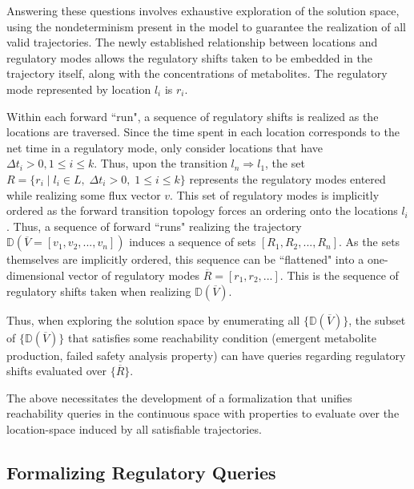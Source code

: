 Answering these questions involves exhaustive exploration of the solution space, using the nondeterminism present in the model to guarantee the realization of all valid trajectories. The newly established relationship between locations and regulatory modes allows the regulatory shifts taken to be embedded in the trajectory itself, along with the concentrations of metabolites. The regulatory mode represented by location $l_i$ is $r_i$.

Within each forward ``run", a sequence of regulatory shifts is realized as the locations are traversed. Since the time spent in each location corresponds to the net time in a regulatory mode, only consider locations that have $\Delta t_i > 0, 1 \leq i \leq k$. Thus, upon the transition $l_n \Rightarrow l_1$, the set $R = \{ r_i \; | \; l_i \in L, \; \Delta t_i > 0, \; 1 \leq i \leq k \}$ represents the regulatory modes entered while realizing some flux vector $v$. This set of regulatory modes is implicitly ordered as the forward transition topology forces an ordering onto the locations $l_i$. Thus, a sequence of forward ``runs" realizing the trajectory $\mathbb{D}(\overline{V} = [v_1, v_2, ..., v_n])$ induces a sequence of sets $[R_1, R_2, ..., R_n]$. As the sets themselves are implicitly ordered, this sequence can be ``flattened" into a one-dimensional vector of regulatory modes $\overline{R} = [r_1, r_2, ...]$. This is the sequence of regulatory shifts taken when realizing $\mathbb{D}(\overline{V})$.

Thus, when exploring the solution space by enumerating all $\{ \mathbb{D}(\overline{V})\}$, the subset of $\{ \mathbb{D}(\overline{V})\}$ that satisfies some reachability condition (emergent metabolite production, failed safety analysis property) can have queries regarding regulatory shifts evaluated over $\{ \overline{R} \}$.

The above necessitates the development of a formalization that unifies reachability queries in the continuous space with properties to evaluate over the location-space induced by all satisfiable trajectories.






\subsection{Formalizing Regulatory Queries}

